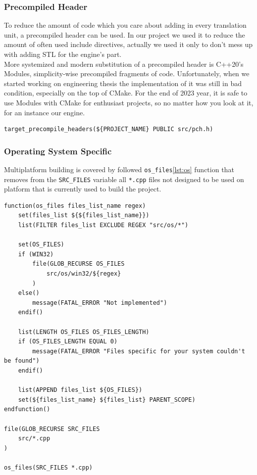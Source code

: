 \subsubsection{Precompiled Header}
\hspace{\parindent} To reduce the amount of code which you care about adding in every translation unit, a precompiled header can be used. In our project we used it to reduce the amount of often used include directives, actually we used it only to don't mess up with adding STL for the engine's part.\\
More systemized and modern substitution of a precompiled header is C++20's Modules, simplicity-wise precompiled fragments of code. Unfortunately, when we started working on engineering thesis the implementation of it was still in bad condition, especially on the top of CMake. For the end of 2023 year, it is safe to use Modules with CMake for enthusiast projects, so no matter how you look at it, for an instance our engine.

\begin{lstlisting}[caption=Adding precompiled header(./engine/CMakeLists.txt)]
target_precompile_headers(${PROJECT_NAME} PUBLIC src/pch.h)
\end{lstlisting}

\subsubsection{Operating System Specific}
\label{sec:build_os}
\hspace{\parindent} Multiplatform building is covered by followed \texttt{os\_files}\ref{lst:os} function that removes from the \texttt{SRC\_FILES} variable all \texttt{*.cpp} files not designed to be used on platform that is currently used to build the project.
\label{lst:os}
\begin{lstlisting}[caption=os\_files function (./engine/CMakeLists.txt)]
function(os_files files_list_name regex)
    set(files_list ${${files_list_name}})
    list(FILTER files_list EXCLUDE REGEX "src/os/*")

    set(OS_FILES)
    if (WIN32)
        file(GLOB_RECURSE OS_FILES
            src/os/win32/${regex}
        )
    else()
        message(FATAL_ERROR "Not implemented")
    endif()

    list(LENGTH OS_FILES OS_FILES_LENGTH)
    if (OS_FILES_LENGTH EQUAL 0)
        message(FATAL_ERROR "Files specific for your system couldn't be found")
    endif()

    list(APPEND files_list ${OS_FILES})
    set(${files_list_name} ${files_list} PARENT_SCOPE)
endfunction()

file(GLOB_RECURSE SRC_FILES
    src/*.cpp
)

os_files(SRC_FILES *.cpp)
\end{lstlisting}

